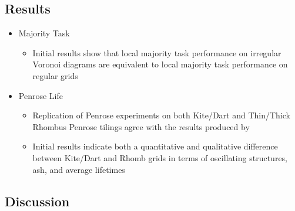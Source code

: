 \documentclass[a4paper, 11pt]{article}
\begin{document}
\subsection*{Results}

\begin{itemize}
\item Majority Task
\begin{itemize}
\item Initial results show that local majority task performance on irregular Voronoi diagrams are equivalent to local majority task performance on regular grids
\end{itemize}

\item Penrose Life
\begin{itemize}
\item Replication of Penrose experiments on both Kite/Dart and Thin/Thick Rhombus Penrose tilings agree with the results produced by \citeauthor{ow10}
\item Initial results indicate both a quantitative and qualitative difference between Kite/Dart and Rhomb grids in terms of oscillating structures, ash, and average lifetimes
\end{itemize}

\end{itemize}

\subsection*{Discussion}



\end{document}
